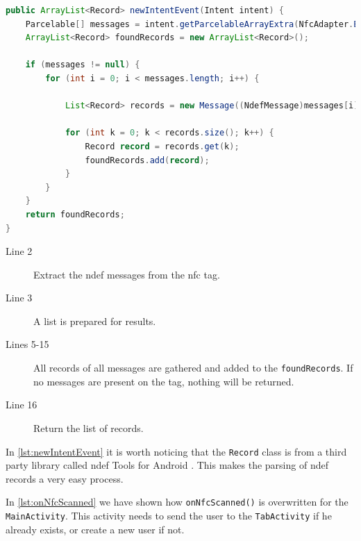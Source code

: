 \begin{lstlisting}[language=java, label=lst:newIntentEvent, caption=\lstinline|newIntentEvent| parsing to records]
public ArrayList<Record> newIntentEvent(Intent intent) {
    Parcelable[] messages = intent.getParcelableArrayExtra(NfcAdapter.EXTRA_NDEF_MESSAGES);
    ArrayList<Record> foundRecords = new ArrayList<Record>();

    if (messages != null) {
        for (int i = 0; i < messages.length; i++) {

            List<Record> records = new Message((NdefMessage)messages[i]);

            for (int k = 0; k < records.size(); k++) {
                Record record = records.get(k);
                foundRecords.add(record);
            }
        }
    }
    return foundRecords;
}
\end{lstlisting}
\begin{description}
\item[Line 2] Extract the \ac{ndef} messages from the \ac{nfc} tag.
\item[Line 3] A list is prepared for results.
\item[Lines 5-15] All records of all messages are gathered and added to the \lstinline|foundRecords|. If no messages are present on the tag, nothing will be returned.
\item[Line 16] Return the list of records.
\end{description}

In \autoref{lst:newIntentEvent} it is worth noticing that the \lstinline|Record| class is from a third party library called \ac{ndef} Tools for Android \citep{ndeftools}. This makes the parsing of \ac{ndef} records a very easy process.

In \autoref{lst:onNfcScanned} we have shown how \lstinline|onNfcScanned()| is overwritten for the \lstinline|MainActivity|. This activity needs to send the user to the \lstinline|TabActivity| if he already exists, or create a new user if not.

